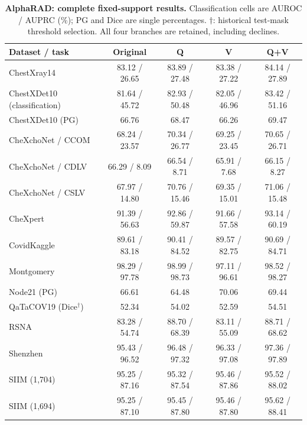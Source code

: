 \begin{table}[tp]
\centering
\caption{\textbf{AlphaRAD: complete fixed-support results.} Classification cells are AUROC / AUPRC (\%); PG and Dice are single percentages. $\dagger$: historical test-mask threshold selection. All four branches are retained, including declines.}
\label{tab:supp-fixed-alpharad}
\small
\setlength{\tabcolsep}{4pt}
\begin{tabular*}{\textwidth}{@{\extracolsep{\fill}}lcccc@{}}
\toprule
Dataset / task & Original & Q & V & Q+V \\
\midrule
ChestXray14 & 83.12 / 26.65 & 83.89 / 27.48 & 83.38 / 27.22 & 84.14 / 27.89 \\
ChestXDet10 (classification) & 81.64 / 45.72 & 82.93 / 50.48 & 82.05 / 46.96 & 83.42 / 51.16 \\
ChestXDet10 (PG) & 66.76 & 68.47 & 66.26 & 69.47 \\
CheXchoNet / CCOM & 68.24 / 23.57 & 70.34 / 26.77 & 69.25 / 23.45 & 70.65 / 26.71 \\
CheXchoNet / CDLV & 66.29 / 8.09 & 66.54 / 8.71 & 65.91 / 7.68 & 66.15 / 8.27 \\
CheXchoNet / CSLV & 67.97 / 14.80 & 70.76 / 15.46 & 69.35 / 15.01 & 71.06 / 15.48 \\
CheXpert & 91.39 / 56.63 & 92.86 / 59.87 & 91.66 / 57.58 & 93.14 / 60.19 \\
CovidKaggle & 89.61 / 83.18 & 90.41 / 84.52 & 89.57 / 82.75 & 90.69 / 84.71 \\
Montgomery & 98.29 / 97.78 & 98.99 / 98.73 & 97.11 / 96.61 & 98.52 / 98.27 \\
Node21 (PG) & 66.61 & 64.48 & 70.06 & 69.44 \\
QaTaCOV19 (Dice$^\dagger$) & 52.34 & 54.02 & 52.59 & 54.51 \\
RSNA & 83.28 / 54.74 & 88.70 / 68.39 & 83.11 / 55.09 & 88.71 / 68.62 \\
Shenzhen & 95.43 / 96.52 & 96.48 / 97.32 & 96.33 / 97.08 & 97.36 / 97.89 \\
SIIM (1,704) & 95.25 / 87.16 & 95.32 / 87.54 & 95.46 / 87.86 & 95.52 / 88.02 \\
SIIM (1,694) & 95.25 / 87.10 & 95.45 / 87.80 & 95.46 / 87.80 & 95.62 / 88.41 \\
\bottomrule
\end{tabular*}
\end{table}

